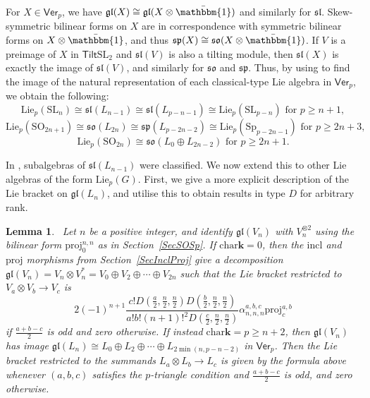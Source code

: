 \documentclass[11pt,a4paper,reqno]{amsart}
\newtheorem{lemma}[theorem]{Lemma}
\theoremstyle{definition}
\newcommand{\bk}{\mathbf{k}}
\numberwithin{equation}{section}
\newcommand{\charr}{\mathrm{char}}
\newcommand{\Ver}{\mathsf{Ver}}
\newcommand{\unit}{{\mathbbm{1}}}
\newcommand{\fsl}{\mathfrak{sl}}
\newcommand{\fgl}{\mathfrak{gl}}
\newcommand{\fso}{\mathfrak{so}}
\newcommand{\fsp}{\mathfrak{sp}}
\newcommand{\Lie}{\mathrm{Lie}}
\newcommand{\Tilt}{\mathsf{Tilt}}
\newcommand{\SL}{\mathrm{SL}}
\newcommand{\SO}{\mathrm{SO}}
\newcommand{\Sp}{\mathrm{Sp}}
\newcommand{\incl}{\mathrm{incl}}
\newcommand{\proj}{\mathrm{proj}}
\begin{document}
For $X\in\Ver_p$, we have $\fgl(X)\cong\fgl(X\otimes\bar\unit)$ and similarly for $\fsl$. Skew-symmetric bilinear forms on $X$ are in correspondence with symmetric bilinear forms on $X\otimes\bar\unit$, and thus $\fsp(X)\cong\fso(X\otimes\bar\unit)$. If $V$ is a preimage of $X$ in $\Tilt\SL_2$ and $\fsl(V)$ is also a tilting module, then $\fsl(X)$ is exactly the image of $\fsl(V)$, and similarly for $\fso$ and $\fsp$. Thus, by using \cite[Table~3.2.4]{CEN} to find the image of the natural representation of each classical-type Lie algebra in $\Ver_p$, we obtain the following:
\[\Lie_p(\SL_n)\cong\fsl(L_{n-1})\cong\fsl(L_{p-n-1})\cong\Lie_p(\SL_{p-n})\text{ for }p\geq n+1,\]
\[\Lie_p(\SO_{2n+1})\cong\fso(L_{2n})\cong\fsp(L_{p-2n-2})\cong\Lie_p(\Sp_{p-2n-1})\text{ for }p\geq2n+3,\]
\[\Lie_p(\SO_{2n})\cong\fso(L_0\oplus L_{2n-2})\text{ for }p\geq2n+1.\]

In \cite[\S4]{CEN}, subalgebras of $\fsl(L_{n-1})$ were classified. We now extend this to other Lie algebras of the form $\Lie_p(G)$. First, we give a more explicit description of the Lie bracket on $\fgl(L_n)$, and utilise this to obtain results in type $D$ for arbitrary rank.

\begin{lemma}~\label{LemglImage}
Let $n$ be a positive integer, and identify $\fgl(V_n)$ with $V_n^{\otimes2}$ using the bilinear form $\proj^{n,n}_0$ as in Section~\ref{SecSOSp}. If $\charr\bk=0$, then the $\incl$ and $\proj$ morphisms from Section~\ref{SecInclProj} give a decomposition $\fgl(V_n)=V_n\otimes V_n^*=V_0\oplus V_2\oplus\cdots\oplus V_{2n}$ such that the Lie bracket restricted to $V_a\otimes V_b\to V_c$ is
\[2(-1)^{n+1}\frac{c!D(\frac a2,\frac n2,\frac n2)D(\frac b2,\frac n2,\frac n2)}{a!b!(n+1)!^2D(\frac c2,\frac n2,\frac n2)}\alpha^{a,b,c}_{n,n,n}\proj^{a,b}_c\]
if $\frac{a+b-c}2$ is odd and zero otherwise. If instead $\charr\bk=p\geq n+2$, then $\fgl(V_n)$ has image $\fgl(L_n)\cong L_0\oplus L_2\oplus\cdots\oplus L_{2\min(n,p-n-2)}$ in $\Ver_p$. Then the Lie bracket restricted to the summands $L_a\otimes L_b\to L_c$ is given by the formula above whenever $(a,b,c)$ satisfies the $p$-triangle condition and $\frac{a+b-c}2$ is odd, and zero otherwise.
\end{lemma}
\end{document}
